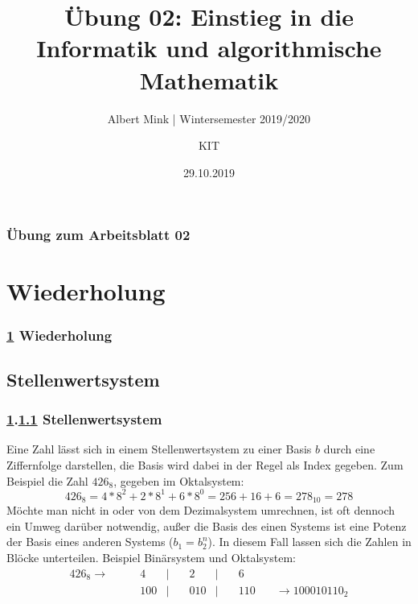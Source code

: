 \documentclass[c,18pt]{beamer}
\date{29.10.2019}
\title{Übung 02: Einstieg in die Informatik und algorithmische Mathematik}
\subtitle{Albert Mink | Wintersemester 2019/2020}
\author[Albert Mink, ]{KIT}
\institute[Institut für Angewandte und Numerische Mathematik (IANM)]{Institut für Angewandte und Numerische Mathematik}
\begin{document}
\begin{frame}
  \maketitle
\end{frame}
\begin{frame}
  \frametitle{Übung zum Arbeitsblatt 02}%
\tableofcontents
\end{frame}


\section{Wiederholung}\label{K:wdh}
\begin{frame}
  \frametitle{\ref{K:wdh} Wiederholung}%
\tableofcontents[current]
\end{frame}


\def\stitle{Stellenwertsystem}
\subsection{\stitle}\label{S:Stellenwertsystem}
\begin{frame}[fragile]%
  \frametitle{\ref{K:wdh}.\ref{S:Stellenwertsystem} \stitle}%

Eine Zahl l\"asst sich in einem Stellenwertsystem zu einer Basis $b$ durch eine Ziffernfolge darstellen, die Basis wird dabei in der Regel als Index gegeben.
Zum Beispiel die Zahl $426_8$, gegeben im Oktalsystem:
\begin{equation*}
426_8 = 4*8^2 + 2*8^1 + 6*8^0 = 256 + 16 + 6 = 278_{10} = 278
\end{equation*}
M\"ochte man nicht in oder von dem Dezimalsystem umrechnen, ist oft dennoch ein Umweg dar\"uber notwendig, au\ss er die Basis des einen Systems ist eine Potenz der Basis eines anderen Systems ($b_1 = b_2^n$).
In diesem Fall lassen sich die Zahlen in Bl\"ocke unterteilen.
Beispiel Bin\"arsystem und Oktalsystem:
\begin{align*}
426_8 \rightarrow \quad & \quad   4 & | & \quad   2 & | & \quad   6 & \\
                        & \quad 100 & | & \quad 010 & | & \quad 110 & \quad \rightarrow 100010110_2
\end{align*}

\end{frame}
\end{document}
